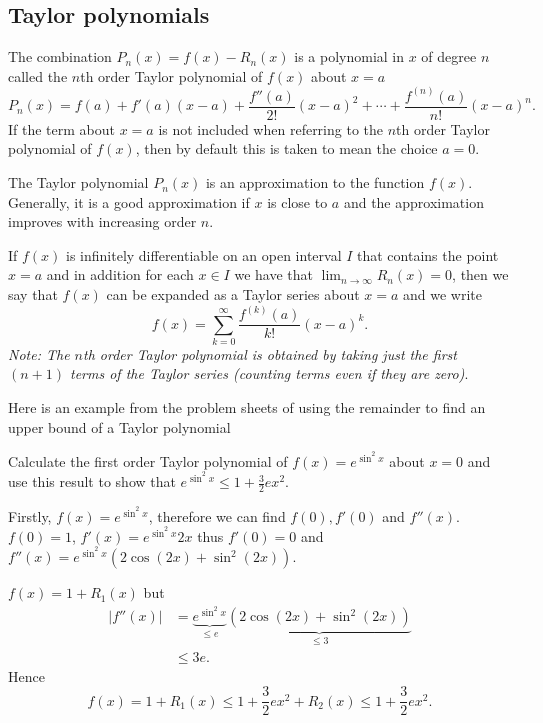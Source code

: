 \documentclass[10pt, a4paper]{article}
\begin{document}
\subsection{Taylor polynomials}
The combination $P_n(x) = f(x) - R_n(x)$ is a polynomial in $x$ of degree $n$ called the $n$th order Taylor polynomial of $f(x)$ about $x = a$
\[
P_n(x) = f(a) + f'(a)(x - a) + \frac{f''(a)}{2!}(x - a) ^ 2 + \dotsi + \frac{f ^ {(n)}(a)}{n!}(x - a) ^ n.
\]
If the term about $x = a$ is not included when referring to the $n$th order Taylor polynomial of $f(x)$,
then by default this is taken to mean the choice $a = 0$.

The Taylor polynomial $P_n(x)$ is an approximation to the function $f(x)$.
Generally,
it is a good approximation if $x$ is close to $a$ and the approximation improves with increasing order $n$.

If $f(x)$ is infinitely differentiable on an open interval $I$ that contains the point $x = a$ and in addition for each $x \in I$ we have that $\lim_{n \rightarrow \infty}R_n(x) = 0$,
then we say that $f(x)$ can be expanded as a Taylor series about $x = a$ and we write
\[
f(x) = \sum_{k = 0}^{\infty}\frac{f ^ {(k)}(a)}{k!}(x - a) ^ k.
\]
\textit{Note: The $n$th order Taylor polynomial is obtained by taking just the first $(n + 1)$ terms of the Taylor series
(counting terms even if they are zero)}.

Here is an example from the problem sheets of using the remainder to find an upper bound of a Taylor polynomial
\begin{example}
    Calculate the first order Taylor polynomial of $f(x) = e ^ {\sin ^ 2{x}}$ about $x = 0$ and use this result to show that $e ^ {\sin ^ 2{x}} \leq 1 + \frac{3}{2}ex ^ 2$.

    \begin{solution}
        Firstly,
        $f(x) = e ^ {\sin ^ 2{x}}$,
        therefore we can find $f(0), f'(0)$ and $f''(x)$.
        $f(0) = 1$,
        $f'(x) = e ^ {\sin ^ 2{x}}2x$ thus $f'(0) = 0$ and $f''(x) = e ^ {\sin ^ 2{x}}(2\cos(2x) + \sin ^ 2(2x))$.

        $f(x) = 1 + R_1(x)$ but
        \begin{align*}
            |f''(x)| &= \underbrace{e ^ {\sin ^ 2{x}}}_{\leq e}\underbrace{(2\cos(2x) + \sin ^ 2(2x))}_{\leq 3} \\
            &\leq 3e.
        \end{align*}
        Hence
        \[
        f(x) = 1 + R_1(x) \leq 1 + \frac{3}{2}ex ^ 2 + R_2(x) \leq 1 + \frac{3}{2}ex ^ 2.
        \]
    \end{solution}
\end{example}
\end{document}
